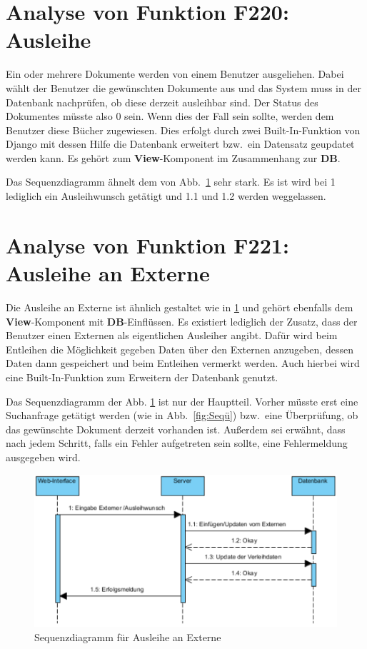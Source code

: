 \section{Analyse von Funktion F220: Ausleihe}
\label{f:220}
Ein oder mehrere Dokumente werden von einem Benutzer ausgeliehen. Dabei wählt der Benutzer die gewünschten Dokumente aus und das System muss in der Datenbank nachprüfen, ob diese derzeit ausleihbar sind. Der Status des Dokumentes müsste also 0 sein. Wenn dies der Fall sein sollte, werden dem Benutzer diese Bücher zugewiesen. Dies erfolgt durch zwei Built-In-Funktion von Django mit dessen Hilfe die Datenbank erweitert bzw.\ ein Datensatz geupdatet werden kann. Es gehört zum \textbf{View}-Komponent im Zusammenhang zur \textbf{DB}.

Das Sequenzdiagramm ähnelt dem von Abb.\ \ref{fig:221} sehr stark. Es ist wird bei 1 lediglich ein Ausleihwunsch getätigt und 1.1 und 1.2 werden weggelassen. 

\section{Analyse von Funktion F221: Ausleihe an Externe}
\label{f:221}
Die Ausleihe an Externe ist ähnlich gestaltet wie in \ref{f:220}  und gehört ebenfalls dem \textbf{View}-Komponent mit \textbf{DB}-Einflüssen. Es existiert lediglich der Zusatz, dass der Benutzer einen Externen als eigentlichen Ausleiher angibt. Dafür wird beim Entleihen die Möglichkeit gegeben Daten über den Externen anzugeben, dessen Daten dann gespeichert und beim Entleihen vermerkt werden. Auch hierbei wird eine Built-In-Funktion zum Erweitern der Datenbank genutzt.

Das Sequenzdiagramm der Abb. \ref{fig:221} ist nur der Hauptteil. Vorher müsste erst eine Suchanfrage getätigt werden (wie in Abb.\ \ref{fig:Seqü}) bzw.\ eine Überprüfung, ob das gewünschte Dokument derzeit vorhanden ist. Außerdem sei erwähnt, dass nach jedem Schritt, falls ein Fehler aufgetreten sein sollte, eine Fehlermeldung ausgegeben wird.
\begin{figure}
\includegraphics[width=0.8\linewidth]{bilder/Seq-Ausleihe.pdf}
\caption{Sequenzdiagramm für Ausleihe an Externe}
\label{fig:221}
\end{figure}


